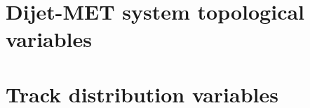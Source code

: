 \section{Dijet-MET system topological variables}


\section{Track distribution variables}


% 
% 
% 


% 
% 


